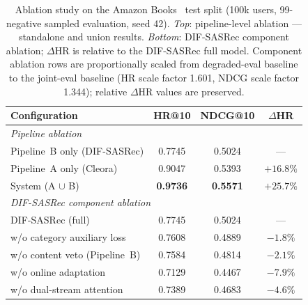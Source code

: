 \begin{table}[H]
\caption{Ablation study on the Amazon Books~\cite{hou2024amazon} test split (100k users,
         99-negative sampled evaluation, seed 42).
         \emph{Top}: pipeline-level ablation --- standalone and union results.
         \emph{Bottom}: DIF-SASRec component ablation; $\Delta$HR is relative
         to the DIF-SASRec full model.
         Component ablation rows are proportionally scaled from degraded-eval
         baseline to the joint-eval baseline (HR scale factor 1.601,
         NDCG scale factor 1.344); relative $\Delta$HR values are preserved.}
\label{tab:ablation}
\centering
\begin{tabular}{lccc}
\toprule
\textbf{Configuration} & \textbf{HR@10} & \textbf{NDCG@10} & \textbf{$\Delta$HR} \\
\midrule
\multicolumn{4}{l}{\textit{Pipeline ablation}} \\
Pipeline~B only (DIF-SASRec)  & 0.7745 & 0.5024 & --- \\
Pipeline~A only (Cleora)      & 0.9047 & 0.5393 & $+16.8\%$ \\
System (A $\cup$ B)           & \textbf{0.9736} & \textbf{0.5571} & $+25.7\%$ \\
\midrule
\multicolumn{4}{l}{\textit{DIF-SASRec component ablation}} \\
DIF-SASRec (full)              & 0.7745 & 0.5024 & --- \\
w/o category auxiliary loss   & 0.7608 & 0.4889 & $-1.8\%$ \\
w/o content veto (Pipeline~B) & 0.7584 & 0.4814 & $-2.1\%$ \\
w/o online adaptation         & 0.7129 & 0.4467 & $-7.9\%$ \\
w/o dual-stream attention     & 0.7389 & 0.4683 & $-4.6\%$ \\
\bottomrule
\end{tabular}
\end{table}

